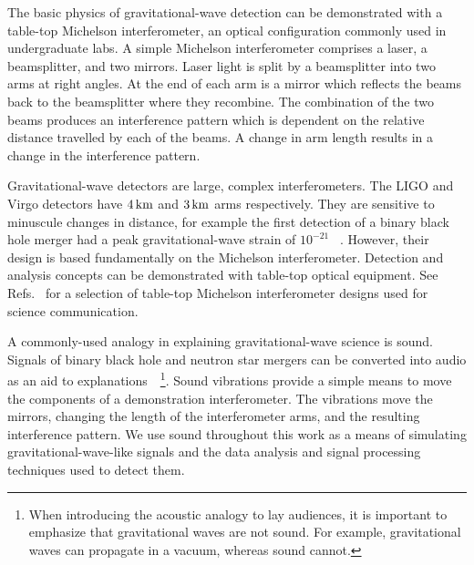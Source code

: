 \documentclass[paper-main.tex]{subfiles}
\begin{document}
The basic physics of gravitational-wave detection can be demonstrated with a table-top Michelson interferometer, an optical configuration commonly used in undergraduate labs. 
A simple Michelson interferometer comprises a laser, a beamsplitter, and two mirrors. 
Laser light is split by a beamsplitter into two arms at right angles. 
At the end of each arm is a mirror which reflects the beams back to the beamsplitter where they recombine. 
The combination of the two beams produces an interference pattern which is dependent on the relative distance travelled by each of the beams. 
A change in arm length results in a change in the interference pattern. 



Gravitational-wave detectors are large, complex interferometers.
The LIGO and Virgo detectors have $4\,{\rm km}$ and $3\,{\rm km}$ arms respectively.
They are sensitive to minuscule changes in distance, for example the first detection of a binary black hole merger had a peak gravitational-wave strain of $10^{-21}$ ~\cite{GW150914}.
However, their design is based fundamentally on the Michelson interferometer. 
Detection and analysis concepts can be demonstrated with table-top optical equipment. 
See Refs.~\cite{TTExhibit:2020,TTExhibit:online,AMIGO:online,ThorLabsIFO,LIGOIFOGlue,LIGOIFOMagnets,FoxEtAl:1999} for a selection of table-top Michelson interferometer designs used for science communication. 
 

A commonly-used analogy in explaining gravitational-wave science is sound. 
Signals of binary black hole and neutron star mergers can be converted into audio as an aid to explanations~\cite{SoundsOfSpaceTime:online,BlackHoleHunter:online}~\footnote{When introducing the acoustic analogy to lay audiences, it is important to emphasize that gravitational waves are not sound. For example, gravitational waves can propagate in a vacuum, whereas sound cannot.}.
Sound vibrations provide a simple means to move the components of a demonstration interferometer. 
The vibrations move the mirrors, changing the length of the interferometer arms, and the resulting interference pattern. 
We use sound throughout this work as a means of simulating gravitational-wave-like signals and the data analysis and signal processing techniques used to detect them.
\end{document}
